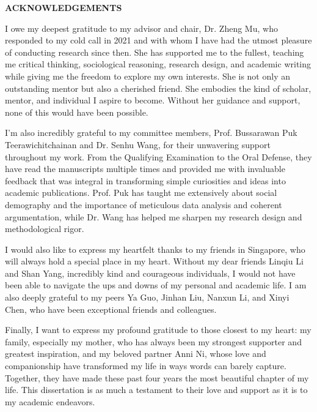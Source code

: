\begin{center}
    {\large \textbf{ACKNOWLEDGEMENTS}}
\end{center}

\thispagestyle{plain}

I owe my deepest gratitude to my advisor and chair, Dr. Zheng Mu, who responded to my cold call in 2021 and with whom I have had the utmost pleasure of conducting research since then. She has supported me to the fullest, teaching me critical thinking, sociological reasoning, research design, and academic writing while giving me the freedom to explore my own interests. She is not only an outstanding mentor but also a cherished friend. She embodies the kind of scholar, mentor, and individual I aspire to become. Without her guidance and support, none of this would have been possible.

I'm also incredibly grateful to my committee members, Prof. Bussarawan Puk Teerawichitchainan and Dr. Senhu Wang, for their unwavering support throughout my work. From the Qualifying Examination to the Oral Defense, they have read the manuscripts multiple times and provided me with invaluable feedback that was integral in transforming simple curiosities and ideas into academic publications. Prof. Puk has taught me extensively about social demography and the importance of meticulous data analysis and coherent argumentation, while Dr. Wang has helped me sharpen my research design and methodological rigor.

I would also like to express my heartfelt thanks to my friends in Singapore, who will always hold a special place in my heart. Without my dear friends Linqiu Li and Shan Yang, incredibly kind and courageous individuals, I would not have been able to navigate the ups and downs of my personal and academic life. I am also deeply grateful to my peers Ya Guo, Jinhan Liu, Nanxun Li, and Xinyi Chen, who have been exceptional friends and colleagues.

Finally, I want to express my profound gratitude to those closest to my heart: my family, especially my mother, who has always been my strongest supporter and greatest inspiration, and my beloved partner Anni Ni, whose love and companionship have transformed my life in ways words can barely capture. Together, they have made these past four years the most beautiful chapter of my life. This dissertation is as much a testament to their love and support as it is to my academic endeavors.

\clearpage